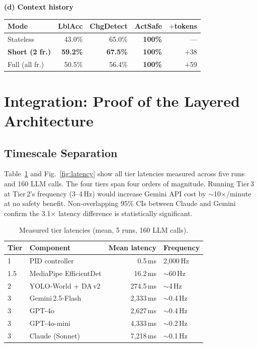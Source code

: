 \documentclass[journal]{IEEEtran}
\begin{document}
\begin{table}[t]
  \textbf{(d) Context history}\vspace{2pt}\\
  \begin{tabular}{lrrrr}
    \toprule
    Mode & LblAcc & ChgDetect & ActSafe & $+$tokens \\
    \midrule
    Stateless              & 43.0\% & 65.0\% & \textbf{100\%} & --- \\
    \textbf{Short (2 fr.)} & \textbf{59.2\%} & \textbf{67.5\%} & \textbf{100\%} & $+$38 \\
    Full (all fr.)         & 50.5\% & 56.4\% & \textbf{100\%} & $+$59 \\
    \bottomrule
  \end{tabular}
\end{table}

\section{Integration: Proof of the Layered Architecture}
\label{sec:integration}

\subsection{Timescale Separation}

Table~\ref{tab:timescale} and Fig.~\ref{fig:latency} show all tier
latencies measured across five runs and 160 LLM calls.
The four tiers span four orders of magnitude.
Running Tier\,3 at Tier\,2's frequency (3--4\,Hz) would increase
Gemini API cost by $\sim$10$\times$/minute at no safety benefit.
Non-overlapping 95\% CIs between Claude and Gemini confirm the
3.1$\times$ latency difference is statistically significant.

\begin{table}[t]
  \caption{Measured tier latencies (mean, 5 runs, 160 LLM calls).}
  \label{tab:timescale}
  \centering
  \small
  \begin{tabular}{llrl}
    \toprule
    Tier & Component & Mean latency & Frequency \\
    \midrule
    1   & PID controller         & 0.5\,ms   & 2,000\,Hz \\
    1.5 & MediaPipe EfficientDet & 16.2\,ms  & $\sim$60\,Hz \\
    2   & YOLO-World + DA\,v2    & 274.5\,ms & $\sim$4\,Hz \\
    3   & Gemini\,2.5-Flash      & 2,333\,ms & $\sim$0.4\,Hz \\
    3   & GPT-4o                 & 2,627\,ms & $\sim$0.4\,Hz \\
    3   & GPT-4o-mini            & 4,333\,ms & $\sim$0.2\,Hz \\
    3   & Claude (Sonnet)        & 7,218\,ms & $\sim$0.1\,Hz \\
    \bottomrule
  \end{tabular}
\end{table}
\end{document}
